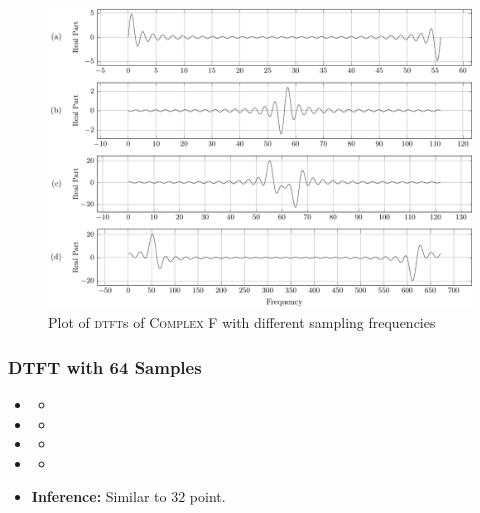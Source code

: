 \documentclass[../../course]{subfiles}
\begin{document}
\vfill

\begin{figure} [H]
    \centering
     {
        \includegraphics[height = 0.8\textheight] {tikzpics/plotDtftComplexF32.pdf}
    }
     {Plot of \textsc{dtft}s of \textsc{Complex F} with different sampling frequencies}
    \label{plt:dtftCplxF32}
\end{figure}

\subsubsection{DTFT with 64 Samples}

\begin{itemize} [label=]

    \item \sampFreqMuchLess
        \begin{itemize} [label=]
            \item
        \end{itemize}

    \item \sampFreqNorm
        \begin{itemize} [label=]
            \item
        \end{itemize}

    \item \sampFreqSligGreat
        \begin{itemize} [label=]
            \item
        \end{itemize}

    \item \sampFreqMuchGreat
        \begin{itemize} [label=]
            \item
        \end{itemize}

    \item \textbf{Inference:} Similar to $32$ point.

\end{itemize}
\end{document}
